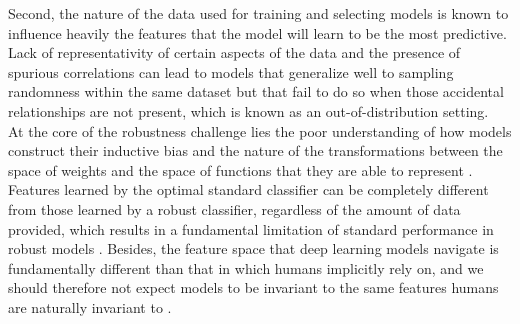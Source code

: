 Second, the nature of the data used for training and selecting
models is known to influence heavily the features that the model 
will learn to be the most predictive. Lack of representativity of 
certain aspects of the data and the presence of spurious 
correlations can lead to models that generalize well to sampling 
randomness within the same dataset but that fail to do so when those 
accidental relationships are not present, which is known as an
out-of-distribution setting. \\

At the core of the robustness challenge lies the poor
understanding of how models construct their inductive bias and the nature
of the transformations between the space of weights and the space of 
functions that they are able to represent \cite{jimenezInductiveBiasDeep}. 
Features learned by the optimal standard classifier can be completely 
different from those learned by a robust classifier, regardless 
of the amount of data provided, which results in a fundamental limitation of standard performance
in robust models \cite{tsiprasRobustnessMayBe2019,zhangTheoreticallyPrincipledTradeoff2019}.
Besides, the feature space that deep learning models navigate is fundamentally 
different than that in which humans implicitly rely on, and we 
should therefore not expect models to be invariant to the 
same features humans are naturally invariant to \cite{ilyasAdversarialExamplesAre2019}. \\

